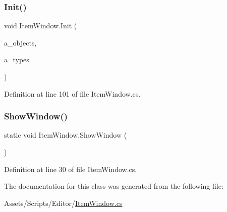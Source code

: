 \subsubsection{\texorpdfstring{Init()}{Init()}}
{\footnotesize\ttfamily void Item\+Window.\+Init (\begin{DoxyParamCaption}\item[{List$<$ Game\+Object $>$}]{a\+\_\+objects,  }\item[{List$<$ Type $>$}]{a\+\_\+types }\end{DoxyParamCaption})}



Definition at line 101 of file Item\+Window.\+cs.

\mbox{\label{class_item_window_ae4a63494162672f222924dbd779ac992}} 
\subsubsection{\texorpdfstring{Show\+Window()}{ShowWindow()}}
{\footnotesize\ttfamily static void Item\+Window.\+Show\+Window (\begin{DoxyParamCaption}{ }\end{DoxyParamCaption})\hspace{0.3cm}{\ttfamily [static]}}



Definition at line 30 of file Item\+Window.\+cs.



The documentation for this class was generated from the following file\+:\begin{DoxyCompactItemize}
\item 
Assets/\+Scripts/\+Editor/\mbox{\hyperlink{_item_window_8cs}{Item\+Window.\+cs}}\end{DoxyCompactItemize}
